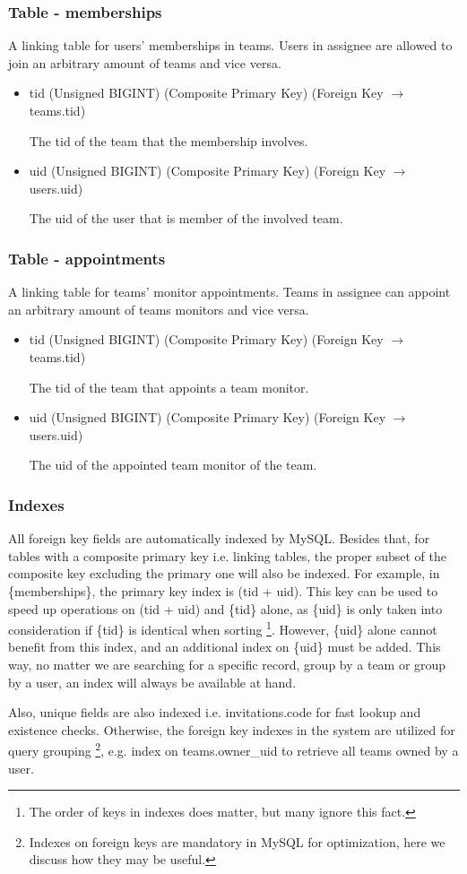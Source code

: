 \documentclass[12pt]{report}
\newcommand{\n}{\par}
\begin{document}
\subsubsection{Table - memberships} \label{data-layer.design.team-system.memberships}
A linking table for users' memberships in teams.
Users in assignee are allowed to join an arbitrary amount of teams and vice versa.
\begin{itemize}
	\item tid (Unsigned BIGINT) (Composite Primary Key) (Foreign Key $\rightarrow$ teams.tid)\n
	      The tid of the team that the membership involves.
	\item uid (Unsigned BIGINT) (Composite Primary Key) (Foreign Key $\rightarrow$ users.uid)\n
	      The uid of the user that is member of the involved team.
\end{itemize}

\subsubsection{Table - appointments} \label{data-layer.design.team-system.appointments}
A linking table for teams' monitor appointments.
Teams in assignee can appoint an arbitrary amount of teams monitors and vice versa.
\begin{itemize}
	\item tid (Unsigned BIGINT) (Composite Primary Key) (Foreign Key $\rightarrow$ teams.tid)\n
	      The tid of the team that appoints a team monitor.
	\item uid (Unsigned BIGINT) (Composite Primary Key) (Foreign Key $\rightarrow$ users.uid)\n
	      The uid of the appointed team monitor of the team.
\end{itemize}

\subsubsection{Indexes} \label{data-layer.design.team-system.indexes}
All foreign key fields are automatically indexed by MySQL.
Besides that, for tables with a composite primary key i.e. linking tables,
the proper subset of the composite key excluding the primary one will also be indexed.
For example, in \{memberships\}, the primary key index is (tid + uid).
This key can be used to speed up operations on (tid + uid) and \{tid\} alone,
as \{uid\} is only taken into consideration if \{tid\} is identical when sorting
\footnote{The order of keys in indexes does matter, but many ignore this fact.}.
However, \{uid\} alone cannot benefit from this index, and an additional index on \{uid\} must be added.
This way, no matter we are searching for a specific record, group by a team or group by a user,
an index will always be available at hand.\n
Also, unique fields are also indexed i.e. invitations.code for fast lookup and existence checks.
Otherwise, the foreign key indexes in the system are utilized for query grouping
\footnote{Indexes on foreign keys are mandatory in MySQL for optimization, here we discuss how they may be useful.},
e.g. index on teams.owner\_uid to retrieve all teams owned by a user.
\end{document}
